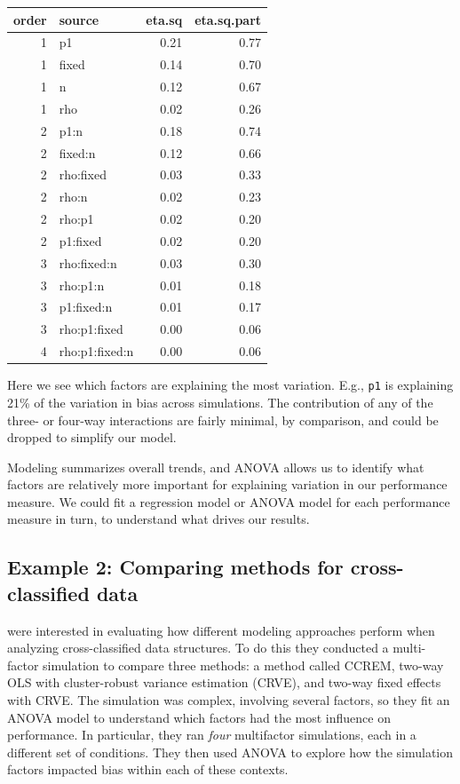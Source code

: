 \documentclass[
]{book}
\begin{document}
\begin{tabular}{r|l|r|r}
\hline
order & source & eta.sq & eta.sq.part\\
\hline
1 & p1 & 0.21 & 0.77\\
\hline
1 & fixed & 0.14 & 0.70\\
\hline
1 & n & 0.12 & 0.67\\
\hline
1 & rho & 0.02 & 0.26\\
\hline
2 & p1:n & 0.18 & 0.74\\
\hline
2 & fixed:n & 0.12 & 0.66\\
\hline
2 & rho:fixed & 0.03 & 0.33\\
\hline
2 & rho:n & 0.02 & 0.23\\
\hline
2 & rho:p1 & 0.02 & 0.20\\
\hline
2 & p1:fixed & 0.02 & 0.20\\
\hline
3 & rho:fixed:n & 0.03 & 0.30\\
\hline
3 & rho:p1:n & 0.01 & 0.18\\
\hline
3 & p1:fixed:n & 0.01 & 0.17\\
\hline
3 & rho:p1:fixed & 0.00 & 0.06\\
\hline
4 & rho:p1:fixed:n & 0.00 & 0.06\\
\hline
\end{tabular}

Here we see which factors are explaining the most variation. E.g., \texttt{p1} is explaining 21\% of the variation in bias across simulations.
The contribution of any of the three- or four-way interactions are fairly minimal, by comparison, and could be dropped to simplify our model.

Modeling summarizes overall trends, and ANOVA allows us to identify what factors are relatively more important for explaining variation in our performance measure.
We could fit a regression model or ANOVA model for each performance measure in turn, to understand what drives our results.

\subsection{Example 2: Comparing methods for cross-classified data}\label{example-2-comparing-methods-for-cross-classified-data}

\citet{lee2023comparing} were interested in evaluating how different modeling approaches perform when analyzing cross-classified data structures.
To do this they conducted a multi-factor simulation to compare three methods: a method called CCREM, two-way OLS with cluster-robust variance estimation (CRVE), and two-way fixed effects with CRVE.
The simulation was complex, involving several factors, so they fit an ANOVA model to understand which factors had the most influence on performance.
In particular, they ran \emph{four} multifactor simulations, each in a different set of conditions.
They then used ANOVA to explore how the simulation factors impacted bias within each of these contexts.
\end{document}
